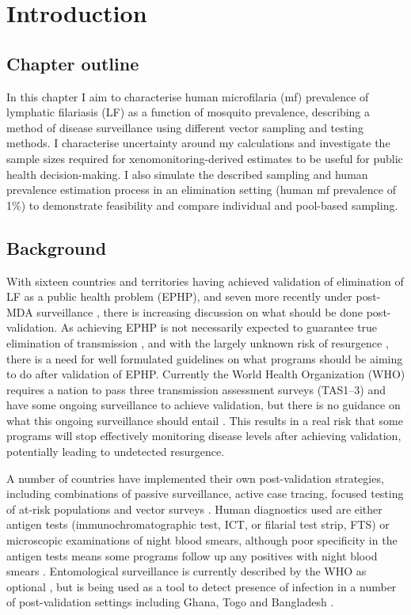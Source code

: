 \section{Introduction}

\subsection{Chapter outline}

In this chapter I aim to characterise human microfilaria (mf) prevalence of lymphatic filariasis (LF) as a function of mosquito prevalence, describing a method of disease surveillance using different vector sampling and testing methods. I characterise uncertainty around my calculations and investigate the sample sizes required for xenomonitoring-derived estimates to be useful for public health decision-making. I also simulate the described sampling and human prevalence estimation process in an elimination setting (human mf prevalence of 1\%) to demonstrate feasibility and compare individual and pool-based sampling.

\subsection{Background}

With sixteen countries and territories having achieved validation of elimination of LF as a public health problem (EPHP), and seven more recently under post-MDA surveillance \cite{WHO2019_FactSheet}, there is increasing discussion on what should be done post-validation. As achieving EPHP is not necessarily expected to guarantee true elimination of transmission \cite{Rao2019}, and with the largely unknown risk of resurgence \cite{Xu2019,NTDMC2019}, there is a need for well formulated guidelines on what programs should be aiming to do after validation of EPHP. Currently the World Health Organization (WHO) requires a nation to pass three transmission assessment surveys (TAS1--3) and have some ongoing surveillance to achieve validation, but there is no guidance on what this ongoing surveillance should entail \cite{WHO2017_Validation}. This results in a real risk that some programs will stop effectively monitoring disease levels after achieving validation, potentially leading to undetected resurgence.

A number of countries have implemented their own post-validation strategies, including combinations of passive surveillance, active case tracing, focused testing of at-risk populations and vector surveys \cite{Rao2019,Dorkenoo2018,Irish2018,Pi2018}. Human diagnostics used are either antigen tests (immunochromatographic test, ICT, or filarial test strip, FTS) or microscopic examinations of night blood smears, although poor specificity in the antigen tests means some programs follow up any positives with night blood smears \cite{Rahman2019}. Entomological surveillance is currently described by the WHO as optional \cite{WHO2017_Validation}, but is being used as a tool to detect presence of infection in a number of post-validation settings including Ghana, Togo and Bangladesh \cite{Dorkenoo2018,Irish2018,Pi2018}. 

